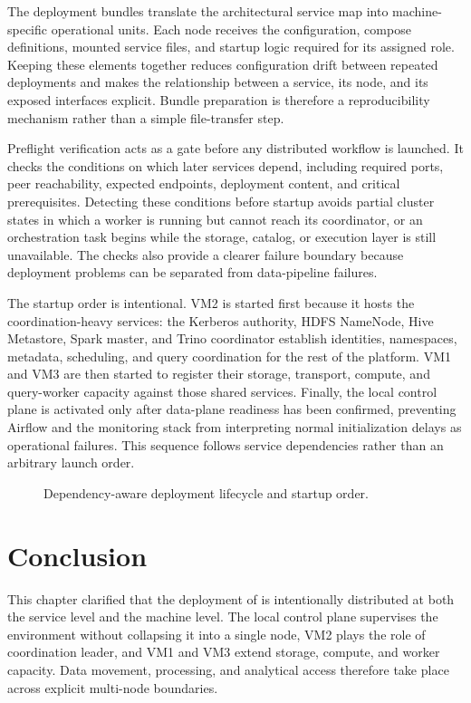 The deployment bundles translate the architectural service map into machine-specific operational units. Each node receives the configuration, compose definitions, mounted service files, and startup logic required for its assigned role. Keeping these elements together reduces configuration drift between repeated deployments and makes the relationship between a service, its node, and its exposed interfaces explicit. Bundle preparation is therefore a reproducibility mechanism rather than a simple file-transfer step.

Preflight verification acts as a gate before any distributed workflow is launched. It checks the conditions on which later services depend, including required ports, peer reachability, expected endpoints, deployment content, and critical prerequisites. Detecting these conditions before startup avoids partial cluster states in which a worker is running but cannot reach its coordinator, or an orchestration task begins while the storage, catalog, or execution layer is still unavailable. The checks also provide a clearer failure boundary because deployment problems can be separated from data-pipeline failures.

The startup order is intentional. VM2 is started first because it hosts the coordination-heavy services: the Kerberos authority, HDFS NameNode, Hive Metastore, Spark master, and Trino coordinator establish identities, namespaces, metadata, scheduling, and query coordination for the rest of the platform. VM1 and VM3 are then started to register their storage, transport, compute, and query-worker capacity against those shared services. Finally, the local control plane is activated only after data-plane readiness has been confirmed, preventing Airflow and the monitoring stack from interpreting normal initialization delays as operational failures. This sequence follows service dependencies rather than an arbitrary launch order.

\clearpage

\begin{figure}[H]
    \centering
    
    \caption{Dependency-aware deployment lifecycle and startup order.}
    \label{fig:chapter6-deployment-lifecycle}
\end{figure}
\FloatBarrier

\section{Conclusion}
This chapter clarified that the deployment of \projectname{} is intentionally distributed at both the service level and the machine level. The local control plane supervises the environment without collapsing it into a single node, VM2 plays the role of coordination leader, and VM1 and VM3 extend storage, compute, and worker capacity. Data movement, processing, and analytical access therefore take place across explicit multi-node boundaries.

